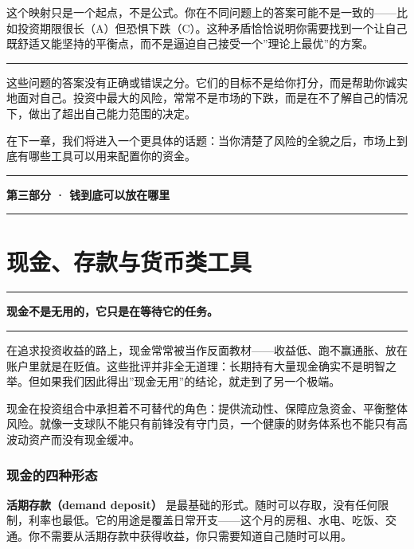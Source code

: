 \documentclass[a4paper,11pt,oneside,fontset=none,UTF8,zihao=-4]{ctexbook}
\newcommand{\partdivider}[1]{%
  \clearpage
  \thispagestyle{empty}%
  \vspace*{5.0cm}%
  \begin{center}%
    {\color{dh-blossom}\rule{0.35\textwidth}{1.5pt}\par}%
    \vspace{1.2cm}%
    {\Huge\bfseries\sffamily\color{dh-navy} #1\par}%
    \vspace{1.2cm}%
    {\color{dh-blossom}\rule{0.35\textwidth}{1.5pt}\par}%
  \end{center}%
  \vfill
  \clearpage
}
\begin{document}
这个映射只是一个起点，不是公式。你在不同问题上的答案可能不是一致的------比如投资期限很长（A）但恐惧下跌（C）。这种矛盾恰恰说明你需要找到一个让自己既舒适又能坚持的平衡点，而不是逼迫自己接受一个''理论上最优''的方案。

\begin{center}{\color{dh-bronze}\rule{0.2\textwidth}{0.5pt}}\end{center}

这些问题的答案没有正确或错误之分。它们的目标不是给你打分，而是帮助你诚实地面对自己。投资中最大的风险，常常不是市场的下跌，而是在不了解自己的情况下，做出了超出自己能力范围的决定。

在下一章，我们将进入一个更具体的话题：当你清楚了风险的全貌之后，市场上到底有哪些工具可以用来配置你的资金。

\partdivider{第三部分 · 钱到底可以放在哪里}

\newpage

\chapter{现金、存款与货币类工具}\label{ux73b0ux91d1ux5b58ux6b3eux4e0eux8d27ux5e01ux7c7bux5de5ux5177}

\begin{center}{\color{dh-bronze}\rule{0.2\textwidth}{0.5pt}}\end{center}

\begin{dhquote}
\textbf{现金不是无用的，它只是在等待它的任务。}
\end{dhquote}

\begin{center}{\color{dh-bronze}\rule{0.2\textwidth}{0.5pt}}\end{center}

在追求投资收益的路上，现金常常被当作反面教材------收益低、跑不赢通胀、放在账户里就是在贬值。这些批评并非全无道理：长期持有大量现金确实不是明智之举。但如果我们因此得出''现金无用''的结论，就走到了另一个极端。

现金在投资组合中承担着不可替代的角色：提供流动性、保障应急资金、平衡整体风险。就像一支球队不能只有前锋没有守门员，一个健康的财务体系也不能只有高波动资产而没有现金缓冲。

\subsection{现金的四种形态}\label{ux73b0ux91d1ux7684ux56dbux79cdux5f62ux6001}

\textbf{活期存款（demand deposit）}
是最基础的形式。随时可以存取，没有任何限制，利率也最低。它的用途是覆盖日常开支------这个月的房租、水电、吃饭、交通。你不需要从活期存款中获得收益，你只需要知道自己随时可以用。
\end{document}
